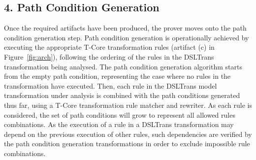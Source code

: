
% 

\subsection*{4. Path Condition Generation}
\label{sec:path_cond_gen}

Once the required artifacts have been produced, the prover moves onto the path
condition generation step. Path condition generation is operationally achieved
by executing the appropriate T-Core transformation rules (artifact (c) in
Figure~\ref{fig:arch}), following the ordering of the rules in the DSLTrans transformation being analysed.
The path condition generation algorithm starts from the empty path condition,
representing the case where no rules in the transformation have executed. Then, each rule in the DSLTrans model transformation under analysis
is combined with the path conditions generated thus far, using a T-Core
transformation rule matcher and rewriter. As each rule is considered, the set
of path conditions will grow to represent all allowed rules combinations. As the execution of a rule in a DSLTrans
transformation may depend on the previous execution of other rules, such
dependencies are verified by the path condition generation
transformations in order to exclude impossible rule combinations.

